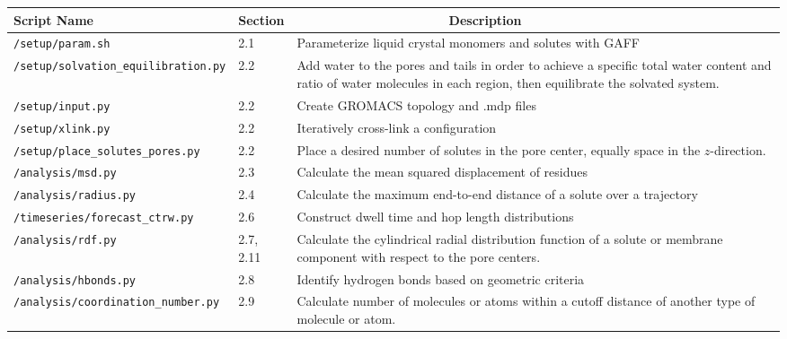   \begin{table}[htb!]
  \centering
  \begin{tabular}{|A|B|C|}
  \hline
  \textbf{Script Name} & \textbf{Section} & ~~~~~~~~~~~~~~~~~~~~~\textbf{Description} \\
  \hline

  \texttt{/setup/param.sh} & 2.1 & Parameterize liquid 
  crystal monomers and solutes with GAFF \\ \hline

  \texttt{/setup/solvation\_equilibration.py} & 2.2 & Add water to the pores and tails
  in order to achieve a specific total water content and ratio of water molecules in each
  region, then equilibrate the solvated system. \\ \hline
  
  \texttt{/setup/input.py} & 2.2 & Create GROMACS topology and .mdp files \\ \hline
  
  \texttt{/setup/xlink.py} & 2.2 & Iteratively cross-link a configuration \\ \hline
  
  \texttt{/setup/place\_solutes\_pores.py} & 2.2 & Place a desired number of solutes
  in the pore center, equally space in the $z$-direction. \\ \hline
  
  \texttt{/analysis/msd.py} & 2.3 & Calculate the mean squared displacement of residues \\ \hline
  
  \texttt{/analysis/radius.py} & 2.4 & Calculate the maximum end-to-end distance of a solute over a trajectory \\ \hline
  
  \texttt{/timeseries/forecast\_ctrw.py} & 2.6 & Construct dwell time and hop length distributions \\ \hline 
  
  \texttt{/analysis/rdf.py} & 2.7, 2.11 & Calculate the cylindrical radial distribution function of
  a solute or membrane component with respect to the pore centers. \\ \hline
  
  \texttt{/analysis/hbonds.py} & 2.8 & Identify hydrogen bonds based on geometric criteria \\ \hline
  
  \texttt{/analysis/coordination\_number.py} & 2.9 & Calculate number of molecules or atoms within a
  cutoff distance of another type of molecule or atom. \\ \hline
  

\end{tabular}
\end{table}
